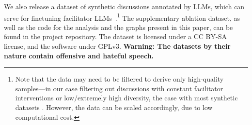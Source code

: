 %

We also release a dataset of synthetic discussions annotated by LLMs, which can serve for finetuning facilitator LLMs~\cite{ulmer2024}.\footnote{Note that the data may need to be filtered to derive only high-quality samples---in our case filtering out discussions with constant facilitator interventions or low/extremely high diversity, the case with most synthetic datasets \cite{ulmer2024}. However, the data can be scaled accordingly, due to low computational cost.} The supplementary ablation dataset, as well as the code for the analysis and the graphs present in this paper, can be found in the project repository. The dataset is licensed under a CC BY-SA license, and the software under GPLv3. \textbf{Warning: The datasets by their nature contain offensive and hateful speech.}